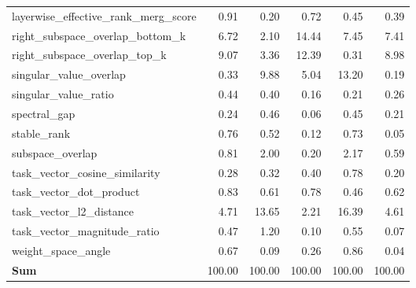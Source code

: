 \begin{table}[h]
\begin{tabular}{lrrrrr}
layerwise\_effective\_rank\_merg\_score & 0.91 & 0.20 & 0.72 & 0.45 & 0.39 \\
right\_subspace\_overlap\_bottom\_k & 6.72 & 2.10 & 14.44 & 7.45 & 7.41 \\
right\_subspace\_overlap\_top\_k & 9.07 & 3.36 & 12.39 & 0.31 & 8.98 \\
singular\_value\_overlap & 0.33 & 9.88 & 5.04 & 13.20 & 0.19 \\
singular\_value\_ratio & 0.44 & 0.40 & 0.16 & 0.21 & 0.26 \\
spectral\_gap & 0.24 & 0.46 & 0.06 & 0.45 & 0.21 \\
stable\_rank & 0.76 & 0.52 & 0.12 & 0.73 & 0.05 \\
subspace\_overlap & 0.81 & 2.00 & 0.20 & 2.17 & 0.59 \\
task\_vector\_cosine\_similarity & 0.28 & 0.32 & 0.40 & 0.78 & 0.20 \\
task\_vector\_dot\_product & 0.83 & 0.61 & 0.78 & 0.46 & 0.62 \\
task\_vector\_l2\_distance & 4.71 & 13.65 & 2.21 & 16.39 & 4.61 \\
task\_vector\_magnitude\_ratio & 0.47 & 1.20 & 0.10 & 0.55 & 0.07 \\
weight\_space\_angle & 0.67 & 0.09 & 0.26 & 0.86 & 0.04 \\
\midrule
\textbf{Sum} & 100.00 & 100.00 & 100.00 & 100.00 & 100.00 \\
\bottomrule
\end{tabular}
\end{table}

